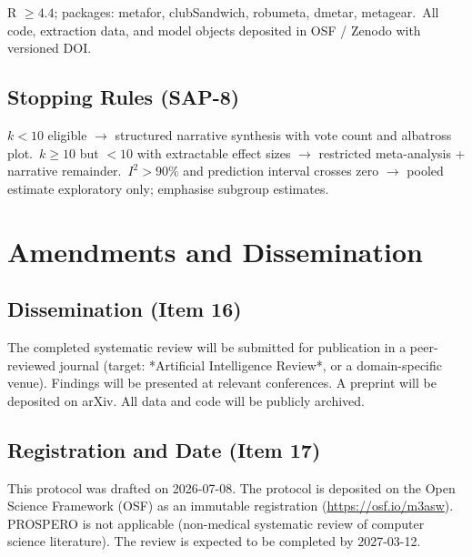 R $\geq 4.4$; packages: metafor, clubSandwich, robumeta, dmetar, metagear.\
All code, extraction data, and model objects deposited in OSF / Zenodo with versioned DOI.

\subsection{Stopping Rules (SAP-8)}

$k < 10$ eligible $\rightarrow$ structured narrative synthesis with vote count and albatross plot.\
$k \geq 10$ but $<10$ with extractable effect sizes $\rightarrow$ restricted meta-analysis + narrative remainder.\
$I^2 > 90\%$ and prediction interval crosses zero $\rightarrow$ pooled estimate exploratory only; emphasise subgroup estimates.

\section{Amendments and Dissemination}\label{sec:protocol}

\subsection{Dissemination (Item 16)}

The completed systematic review will be submitted for publication in a peer-reviewed journal (target: *Artificial Intelligence Review*, or a domain-specific venue). Findings will be presented at relevant conferences. A preprint will be deposited on arXiv. All data and code will be publicly archived.

\subsection{Registration and Date (Item 17)}

This protocol was drafted on 2026-07-08. The protocol is deposited on the Open Science Framework (OSF) as an immutable registration (\url{https://osf.io/m3asw}). PROSPERO is not applicable (non-medical systematic review of computer science literature). The review is expected to be completed by 2027-03-12.

